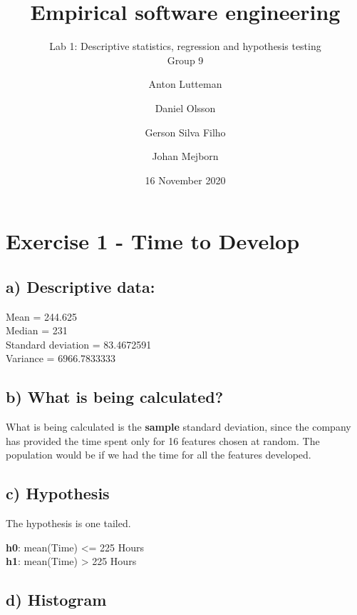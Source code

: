 \documentclass[
]{article}
\title{Empirical software engineering}
\subtitle{Lab 1: Descriptive statistics, regression and hypothesis testing\\
Group 9}
\author{Anton Lutteman \and Daniel Olsson \and Gerson Silva Filho \and Johan Mejborn}
\date{16 November 2020}
\begin{document}
\maketitle

\hypertarget{exercise-1---time-to-develop}{%
\section{Exercise 1 - Time to
Develop}\label{exercise-1---time-to-develop}}

\hypertarget{a-descriptive-data}{%
\subsection{a) Descriptive data:}\label{a-descriptive-data}}

Mean = 244.625\\
Median = 231\\
Standard deviation = 83.4672591\\
Variance = 6966.7833333\\

\hypertarget{b-what-is-being-calculated}{%
\subsection{b) What is being
calculated?}\label{b-what-is-being-calculated}}

What is being calculated is the \textbf{sample} standard deviation,
since the company has provided the time spent only for 16 features
chosen at random. The population would be if we had the time for all the
features developed.

\hypertarget{c-hypothesis}{%
\subsection{c) Hypothesis}\label{c-hypothesis}}

The hypothesis is one tailed.

\textbf{h0}: mean(Time) \textless= 225 Hours\\
\textbf{h1}: mean(Time) \textgreater{} 225 Hours

\hypertarget{d-histogram}{%
\subsection{d) Histogram}\label{d-histogram}}
\end{document}
